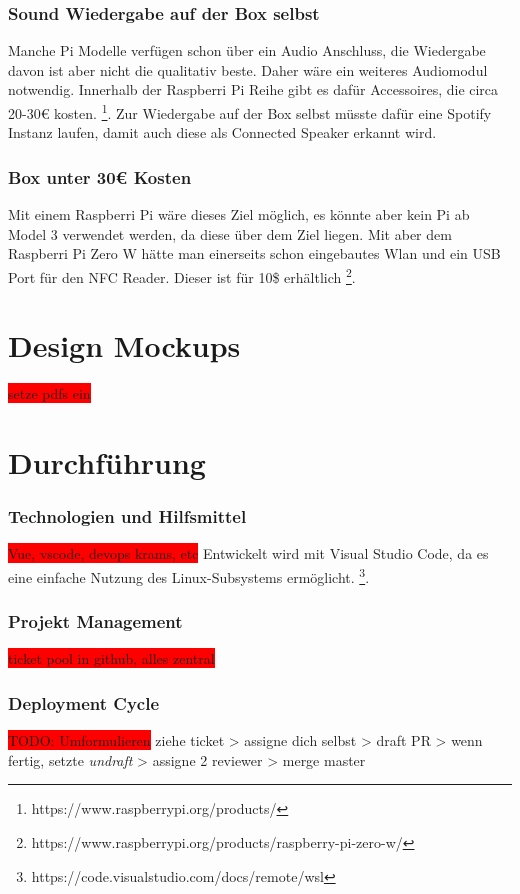 \documentclass[10pt, a4paper, draft]{article}
\begin{document}
\subsubsection{Sound Wiedergabe auf der Box selbst}
Manche Pi Modelle verfügen schon über ein Audio Anschluss, die Wiedergabe davon ist aber nicht die qualitativ beste. Daher wäre ein weiteres Audiomodul notwendig. Innerhalb der Raspberri Pi Reihe gibt es dafür Accessoires, die circa 20-30€ kosten. \footnote{https://www.raspberrypi.org/products/}.
Zur Wiedergabe auf der Box selbst müsste dafür eine Spotify Instanz laufen, damit auch diese als Connected Speaker erkannt wird.

\subsubsection{Box unter 30€ Kosten}
Mit einem Raspberri Pi wäre dieses Ziel möglich, es könnte aber kein Pi ab Model 3 verwendet werden, da diese über dem Ziel liegen.
Mit aber dem Raspberri Pi Zero W hätte man einerseits schon eingebautes Wlan und ein USB Port für den NFC Reader. Dieser ist für 10\$ erhältlich \footnote{https://www.raspberrypi.org/products/raspberry-pi-zero-w/}.

\section{Design Mockups}
\colorbox{red}{setze pdfs ein}

\section{Durchführung}
\subsubsection{Technologien und Hilfsmittel}
\colorbox{red}{Vue, vscode, devops krams, etc}
Entwickelt wird mit Visual Studio Code, da es eine einfache Nutzung des Linux-Subsystems ermöglicht. \footnote{https://code.visualstudio.com/docs/remote/wsl}.

\subsubsection{Projekt Management}
\colorbox{red}{ticket pool in github, alles zentral}

\subsubsection{Deployment Cycle}
\colorbox{red}{TODO: Umformulieren} ziehe ticket > assigne dich selbst > draft PR > wenn fertig, setzte \textit{undraft} > assigne 2 reviewer > merge master
\end{document}
